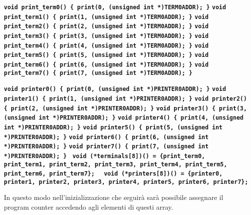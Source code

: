 \documentclass{article}
\begin{document}
	\texttt{\textbf{void print\_term0() \{ print(0, (unsigned int *)TERM0ADDR); \}}}
	\newline
	\texttt{\textbf{void print\_term1() \{ print(1, (unsigned int *)TERM0ADDR); \}}}
	\newline
	\texttt{\textbf{void print\_term2() \{ print(2, (unsigned int *)TERM0ADDR); \}}}
	\newline
	\texttt{\textbf{void print\_term3() \{ print(3, (unsigned int *)TERM0ADDR); \}}}
	\newline
	\texttt{\textbf{void print\_term4() \{ print(4, (unsigned int *)TERM0ADDR); \}}}
	\newline
	\texttt{\textbf{void print\_term5() \{ print(5, (unsigned int *)TERM0ADDR); \}}}
	\newline
	\texttt{\textbf{void print\_term6() \{ print(6, (unsigned int *)TERM0ADDR); \}}}
	\newline
	\texttt{\textbf{void print\_term7() \{ print(7, (unsigned int *)TERM0ADDR); \}}}
	\newline

	\texttt{\textbf{void printer0() \{ print(0, (unsigned int *)PRINTER0ADDR); \}}}
	\newline
	\texttt{\textbf{void printer1() \{ print(1, (unsigned int *)PRINTER0ADDR); \}}}
	\newline
	\texttt{\textbf{void printer2() \{ print(2, (unsigned int *)PRINTER0ADDR); \}}}
	\newline
	\texttt{\textbf{void printer3() \{ print(3, (unsigned int *)PRINTER0ADDR); \}}}
	\newline
	\texttt{\textbf{void printer4() \{ print(4, (unsigned int *)PRINTER0ADDR); \}}}
	\newline
	\texttt{\textbf{void printer5() \{ print(5, (unsigned int *)PRINTER0ADDR); \}}}
	\newline
	\texttt{\textbf{void printer6() \{ print(6, (unsigned int *)PRINTER0ADDR); \}}}
	\newline
	\texttt{\textbf{void printer7() \{ print(7, (unsigned int *)PRINTER0ADDR); \}}}
	\newline
	\newline
	\texttt{\textbf{ void (*terminals[8])() = \{print\_term0, print\_term1, print\_term2,
	print\_term3, print\_term4, print\_term5, print\_term6, print\_term7\}; }}
	\newline
	\texttt{\textbf{ void (*printers[8])() = \{printer0, printer1, printer2, printer3,
	printer4, printer5, printer6, printer7\};}}

	In questo modo nell'inizializzazione che seguirà sarà possibile assegnare il
	program counter accedendo agli elementi di questi array.
\end{document}
